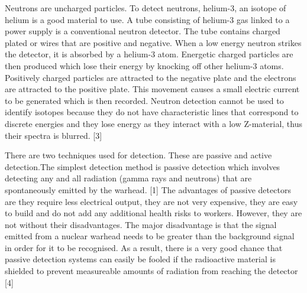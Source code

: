 \documentclass[a4paper]{article}
\begin{document}
Neutrons are uncharged particles. To detect neutrons, helium-3, an isotope of helium is a
good material to use. A tube consisting of helium-3 gas linked to a power supply is a
conventional neutron detector. The tube contains charged plated or wires that are positive and
negative. When a low energy neutron strikes the detector, it is absorbed by a helium-3 atom.
Energetic charged particles are then produced which lose their energy by knocking off other
helium-3 atoms. Positively charged particles are attracted to the negative plate and the electrons
are attracted to the positive plate. This movement causes a small electric current to be generated
which is then recorded. Neutron detection cannot be used to identify isotopes because they do
not have characteristic lines that correspond to discrete energies and they lose energy as they
interact with a low Z-material, thus their spectra is blurred. [3]

There are two techniques used for detection. These are passive and active detection.The
simplest detection method is passive detection which involves detecting any and all radiation
(gamma rays and neutrons) that are spontaneously emitted by the warhead. [1] The advantages of
passive detectors are they require less electrical output, they are not very expensive, they are
easy to build and do not add any additional health risks to workers. However, they are not
without their disadvantages. The major disadvantage is that the signal emitted from a nuclear
warhead needs to be greater than the background signal in order for it to be recognised. As a
result, there is a very good chance that passive detection systems can easily be fooled if the
radioactive material is shielded to prevent measureable amounts of radiation from reaching the
detector [4]
\end{document}
